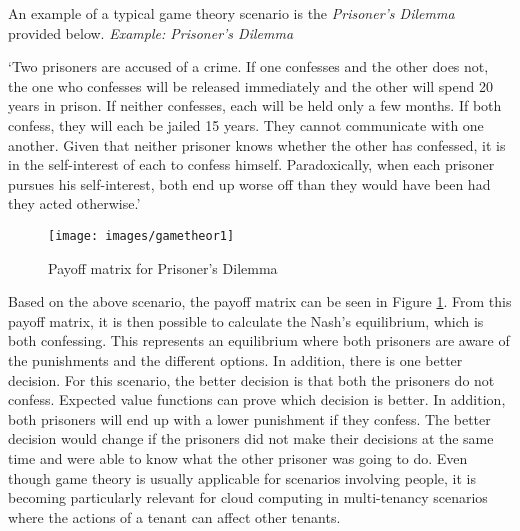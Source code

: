 An example of a typical game theory scenario is the \emph{Prisoner's
Dilemma} provided below.
\newline\newline
\emph{Example: Prisoner's Dilemma}
\begin{displayquote}
`Two prisoners are accused of a crime. If one confesses and the other does not, the one who confesses will be released immediately and the other will spend 20 years in prison. If neither confesses, each will be held only a few months. If both confess, they will each be jailed 15 years. They cannot communicate with one another. Given that neither prisoner knows whether the other has confessed, it is in the self-interest of each to confess himself. Paradoxically, when each prisoner pursues his self-interest, both end up worse off than they would have been had they acted otherwise.' \cite{encylopediabritt}
\begin{figure} [hbt!]
    \centering
    \texttt{[image: images/gametheor1]}
    \caption{Payoff matrix for Prisoner's Dilemma}
    \label{fig:mgametheroy}
\end{figure}
\end{displayquote}
Based on the above scenario, the payoff matrix can be seen in Figure \ref{fig:mgametheroy}. From this payoff matrix, it is then possible to calculate the Nash's
equilibrium, which is both confessing. This represents an equilibrium where both prisoners are
aware of the punishments and the different options. In addition, there
is one better decision. For this scenario, the better decision is that
both the prisoners do not confess. Expected value functions can prove
which decision is better. In addition, both prisoners will end up with a
lower punishment if they confess. The better decision would change if
the prisoners did not make their decisions at the same time and were
able to know what the other prisoner was going to do.
\newline\newline
Even though game theory is usually applicable for scenarios
involving people, it is becoming particularly relevant for cloud
computing in multi-tenancy scenarios where the actions of a tenant can
affect other tenants.



